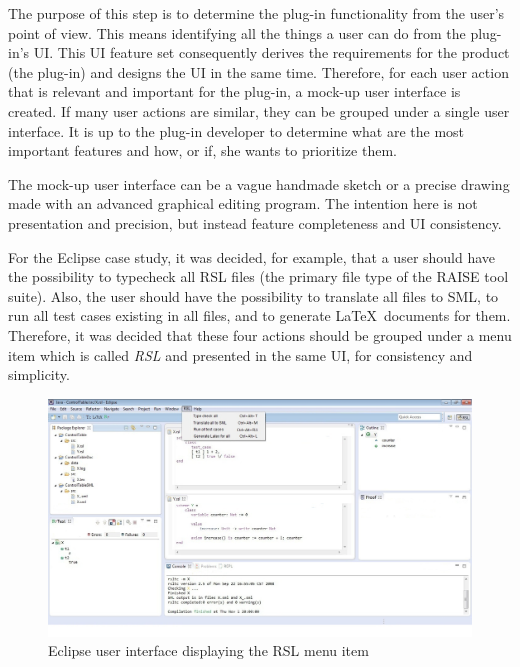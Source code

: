 \documentclass[conference]{IEEEtran}
\begin{document}
The purpose of this step is to determine the plug-in functionality
from the user's point of view. This means identifying all the things a
user can do from the plug-in's UI. This UI feature set consequently
derives the requirements for the product (the plug-in) and designs the
UI in the same time. Therefore, for each user action that is relevant
and important for the plug-in, a mock-up user interface is created. If
many user actions are similar, they can be grouped under a single user
interface. It is up to the plug-in developer to determine what are the
most important features and how, or if, she wants to prioritize them.

The mock-up user interface can be a vague handmade sketch or a
precise drawing made with an advanced graphical editing program.  The
intention here is not presentation and precision, but instead feature
completeness and UI consistency.

For the Eclipse case study, it was decided, for example, that a user
should have the possibility to typecheck all RSL files (the primary
file type of the RAISE tool suite). Also, the user should have the
possibility to translate all files to SML, to run all test cases
existing in all files, and to generate \LaTeX\ documents for them.
Therefore, it was decided that these four actions should be grouped
under a menu item which is called \emph{RSL} and presented in the same
UI, for consistency and simplicity.


\begin{figure}[ht!] \centering
\includegraphics[width=7in]{RSLMenu.jpeg} 
\caption{Eclipse user interface displaying the RSL menu item} 
\label{UIMenu} 
\end{figure}
\end{document}
